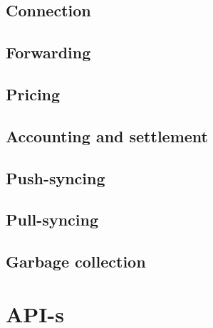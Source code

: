\section{Connection  \statusorange}\label{spec:strategy:connection}
%

\section{Forwarding  \statusorange}\label{spec:strategy:forwarding}


\section{Pricing  \statusorange}\label{spec:strategy:pricing}


\section{Accounting and settlement  \statusorange}\label{spec:strategy:swap}


\section{Push-syncing  \statusorange}\label{spec:strategy:push-sync}


\section{Pull-syncing  \statusorange}\label{spec:strategy:pull-sync}


\section{Garbage collection \statusorange}\label{spec:strategy:garbage-collection}


\chapter{API-s}\label{spec:api}


